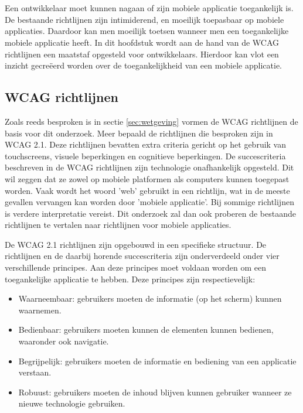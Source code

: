\chapter{}
\label{ch:Richtlijnen voor toegankelijkheid mobiele applicaties}
Een ontwikkelaar moet kunnen nagaan of zijn mobiele applicatie toegankelijk is. De bestaande richtlijnen zijn intimiderend, en moeilijk toepasbaar op mobiele applicaties. Daardoor kan men moeilijk toetsen wanneer men een toegankelijke mobiele applicatie heeft. In dit hoofdstuk wordt aan de hand van de WCAG richtlijnen een maatstaf opgesteld voor ontwikkelaars. Hierdoor kan vlot een inzicht gecreëerd worden over de toegankelijkheid van een mobiele applicatie.

\section{WCAG richtlijnen}
\label{sec:WCAGrichtlijn}

Zoals reeds besproken is in sectie \ref{sec:wetgeving} vormen de WCAG richtlijnen de basis voor dit onderzoek. Meer bepaald de richtlijnen die besproken zijn in WCAG 2.1. Deze richtlijnen bevatten extra criteria gericht op het gebruik van touchscreens, visuele beperkingen en cognitieve beperkingen.
De succescriteria beschreven in de WCAG richtlijnen zijn technologie onafhankelijk opgesteld. Dit wil zeggen dat ze zowel op mobiele platformen als computers kunnen toegepast worden\autocite{w3cTechnologyNeutral}. Vaak wordt het woord 'web' gebruikt in een richtlijn, wat in de meeste gevallen vervangen kan worden door 'mobiele applicatie'. Bij sommige richtlijnen is verdere interpretatie vereist. Dit onderzoek zal dan ook proberen de bestaande richtlijnen te vertalen naar richtlijnen voor mobiele applicaties.

De WCAG 2.1 richtlijnen zijn opgebouwd in een specifieke structuur. De richtlijnen en de daarbij horende succescriteria zijn onderverdeeld onder vier verschillende principes. Aan deze principes moet voldaan worden om een toegankelijke applicatie te hebben. Deze principes zijn respectievelijk: 
\begin{itemize}
    \item Waarneembaar: gebruikers moeten de informatie (op het scherm) kunnen waarnemen.
        \item Bedienbaar: gebruikers moeten kunnen de elementen kunnen bedienen, waaronder ook navigatie.
        \item Begrijpelijk: gebruikers moeten de informatie en bediening van een applicatie verstaan.
        \item Robuust: gebruikers moeten de inhoud blijven kunnen gebruiker wanneer ze nieuwe technologie gebruiken.
\end{itemize}

